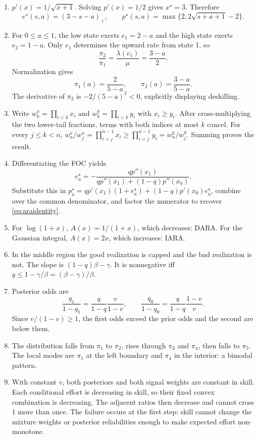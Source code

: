 \documentclass[11pt]{article}
\theoremstyle{tutorial}
\theoremstyle{remark}
\newcommand{\1}{\mathbb{I}}
\newcommand{\pos}[1]{\left(#1\right)_{+}}
\begin{document}
\begin{enumerate}[label=\textbf{S\arabic*.}]
  \item $p'(x)=1/\sqrt{x+1}$.  Solving $p'(x)=1/2$ gives $x^\star=3$.  Therefore
  \[
  e^\star(s,a)=\pos{3-s-a},\qquad
  p^\star(s,a)=\max\{2,2\sqrt{s+a+1}-2\}.
  \]

  \item For $0\le a\le1$, the low state exerts $e_1=2-a$ and the high state exerts $e_2=1-a$.
  Only $e_1$ determines the upward rate from state 1, so
  \[
  \frac{\pi_2}{\pi_1}=\frac{\lambda(e_1)}{\mu}=\frac{3-a}{2}.
  \]
  Normalization gives
  \[
  \pi_1(a)=\frac{2}{5-a},\qquad \pi_2(a)=\frac{3-a}{5-a}.
  \]
  The derivative of $\pi_2$ is $-2/(5-a)^2<0$, explicitly displaying deskilling.

  \item Write $w_k^x=\prod_{i<k}x_i$ and $w_k^y=\prod_{i<k}y_i$ with $x_i\ge y_i$.
  After cross-multiplying the two lower-tail fractions, terms with both indices at most $k$ cancel.
  For every $j\le k<n$, $w_n^x/w_j^x=\prod_{i=j}^{n-1}x_i\ge
  \prod_{i=j}^{n-1}y_i=w_n^y/w_j^y$.  Summing proves the result.

  \item Differentiating the FOC yields
  \[
  e^\star_{\bar a}=-\frac{q p''(x_1)}{q p''(x_1)+(1-q)p''(x_0)}.
  \]
  Substitute this in
  $p^\star_{\bar a}=q p'(x_1)(1+e^\star_{\bar a})+(1-q)p'(x_0)e^\star_{\bar a}$,
  combine over the common denominator, and factor the numerator to recover \eqref{eq:araidentity}.

  \item For $\log(1+x)$, $A(x)=1/(1+x)$, which decreases: DARA.  For the Gaussian integral,
  $A(x)=2x$, which increases: IARA.

  \item In the middle region the good realization is capped and the bad realization is not.  The slope is
  $(1-q)\beta-\gamma$.  It is nonnegative iff $q\le1-\gamma/\beta=(\beta-\gamma)/\beta$.

  \item Posterior odds are
  \[
  \frac{q_1}{1-q_1}=\frac{q}{1-q}\frac{v}{1-v},\qquad
  \frac{q_0}{1-q_0}=\frac{q}{1-q}\frac{1-v}{v}.
  \]
  Since $v/(1-v)\ge1$, the first odds exceed the prior odds and the second are below them.

  \item The distribution falls from $\pi_1$ to $\pi_2$, rises through $\pi_3$ and $\pi_4$, then falls to
  $\pi_5$.  The local modes are $\pi_1$ at the left boundary and $\pi_4$ in the interior: a bimodal pattern.

  \item With constant $v$, both posteriors and both signal weights are constant in skill.  Each conditional
  effort is decreasing in skill, so their fixed convex combination is decreasing.  The adjacent ratios then
  decrease and cannot cross $1$ more than once.  The failure occurs at the first step: skill cannot change
  the mixture weights or posterior reliabilities enough to make expected effort non-monotone.
\end{enumerate}
\end{document}
